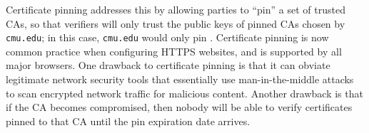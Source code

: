 \documentclass[11pt,twoside]{scrartcl}
\begin{document}
Certificate pinning addresses this by allowing parties to ``pin'' a set of trusted CAs, so that verifiers will only trust the public keys of pinned CAs chosen by \verb'cmu.edu'; in this case, \verb'cmu.edu' would only pin \tca. Certificate pinning is now common practice when configuring HTTPS websites, and is supported by all major browsers. One drawback to certificate pinning is that it can obviate legitimate network security tools that essentially use man-in-the-middle attacks to scan encrypted network traffic for malicious content. Another drawback is that if the CA becomes compromised, then nobody will be able to verify certificates pinned to that CA until the pin expiration date arrives.



\end{document}
